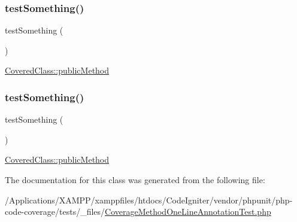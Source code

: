 \subsubsection{\texorpdfstring{test\+Something()}{testSomething()}\hspace{0.1cm}{\footnotesize\ttfamily [1/2]}}
{\footnotesize\ttfamily test\+Something (\begin{DoxyParamCaption}{ }\end{DoxyParamCaption})}

\mbox{\hyperlink{class_covered_class_ab07dfd901b43d1dcdbc2d116d7f5a566}{Covered\+Class\+::public\+Method}} \mbox{\label{class_coverage_method_one_line_annotation_test_a0fc4e17369bc9607ebdd850d9eda8167}} 
\subsubsection{\texorpdfstring{test\+Something()}{testSomething()}\hspace{0.1cm}{\footnotesize\ttfamily [2/2]}}
{\footnotesize\ttfamily test\+Something (\begin{DoxyParamCaption}{ }\end{DoxyParamCaption})}

\mbox{\hyperlink{class_covered_class_ab07dfd901b43d1dcdbc2d116d7f5a566}{Covered\+Class\+::public\+Method}} 

The documentation for this class was generated from the following file\+:\begin{DoxyCompactItemize}
\item 
/\+Applications/\+X\+A\+M\+P\+P/xamppfiles/htdocs/\+Code\+Igniter/vendor/phpunit/php-\/code-\/coverage/tests/\+\_\+files/\mbox{\hyperlink{php-code-coverage_2tests_2__files_2_coverage_method_one_line_annotation_test_8php}{Coverage\+Method\+One\+Line\+Annotation\+Test.\+php}}\end{DoxyCompactItemize}
